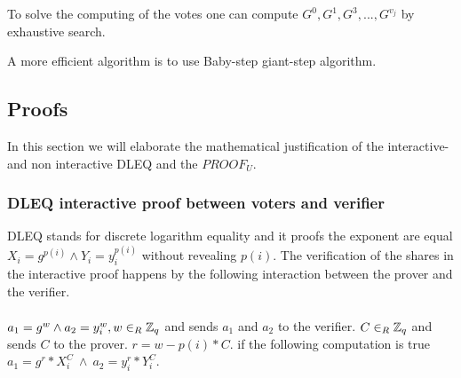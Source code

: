  To solve the computing of the votes one can compute \begin{math}G^0, G^1, G^3,..., G^{v_j} \end{math} by exhaustive search. 

 A more efficient algorithm is to use Baby-step giant-step algorithm. 


\subsection{Proofs}
In this section we will elaborate the mathematical justification of the interactive- and non interactive DLEQ and the $PROOF_U$. 
\subsubsection{DLEQ interactive proof between voters and verifier}
DLEQ stands for discrete logarithm equality and it proofs the exponent are equal \begin{math}X_i=g^{p(i)}  \land Y_i=y_i^{p(i)} \end{math} without revealing \begin{math}{p(i)} \end{math}. The verification of the shares in the interactive proof happens by the following  interaction between the prover and the verifier.\\\\

\noindent
{}  \begin{math}a_1=g^w  \land a_2=y_i^w,  w\in_R \mathbb{Z}_q \end{math} and sends $a_1$ and $a_2$ to the verifier.   \begin{math}C\in_R \mathbb{Z}_q \end{math} and sends $C$ to the prover.   \begin{math}r=w-p(i) * C\end{math}.   if the following computation is true \begin{math}a_1 = g^r*X_i^C \ \land \ a_2=y_i^r*Y_i^C\end{math}.



